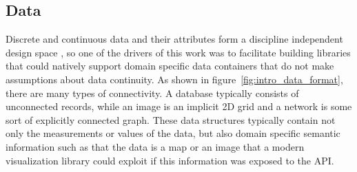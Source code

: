 \documentclass[../main.tex]{subfiles}
\begin{document}
\subsection{Data}
\label{sec:intro_data}
Discrete and continuous data and their attributes form a discipline independent design space \cite{pousmanCasualInformation2007}, so one of the drivers of this work was to facilitate building libraries that could natively support domain specific data containers that do not make assumptions about data continuity. As shown in figure~\ref{fig:intro_data_format}, there are many types of connectivity. A database typically consists of unconnected records, while an image is an implicit 2D grid and a network is some sort of explicitly connected graph. These data structures typically contain not only the measurements or values of the data, but also domain specific semantic information such as that the data is a map or an image that a modern visualization library could exploit if this information was exposed to the API. 
\end{document}
